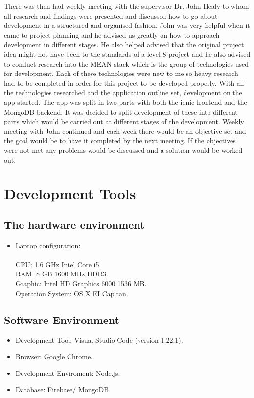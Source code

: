 There was then had weekly meeting with the supervisor Dr. John Healy to whom all research and findings were presented and discussed how to go about development in a structured and organised fashion. John was very helpful when it came to project planning and he advised us greatly on how to approach development in different stages. He also helped advised that the original project idea might not have been to the standards of a level 8 project and he also advised to conduct research into the MEAN stack which is the group of technologies used for development.
Each of these technologies were new to me so heavy research had to be completed in order for this project to be developed properly. With all the technologies researched and the application outline set, development on the app started. The app was split in two parts with both the ionic frontend and the MongoDB backend. It was decided to split development of these into different parts which would be carried out at different stages of the development. 
Weekly meeting with John continued and each week there would be an objective set and the goal would be to have it completed by the next meeting. If the objectives were not met any problems would be discussed and a solution would be worked out. 

\section{Development Tools}
\subsection{The hardware environment}
\begin{itemize}
\item Laptop configuration: \\ \\ CPU: 1.6 GHz Intel Core i5. \\ RAM: 8 GB 1600 MHz DDR3. \\ Graphic: Intel HD Graphics 6000 1536 MB. \\ Operation System: OS X EI Capitan.
\end{itemize}

\subsection{Software Environment}
\begin{itemize}
\item Development Tool: Visual Studio Code (version 1.22.1).
\item Browser: Google Chrome.
\item Development Enviroment: Node.js.
\item Database: Firebase/ MongoDB
\end{itemize}

